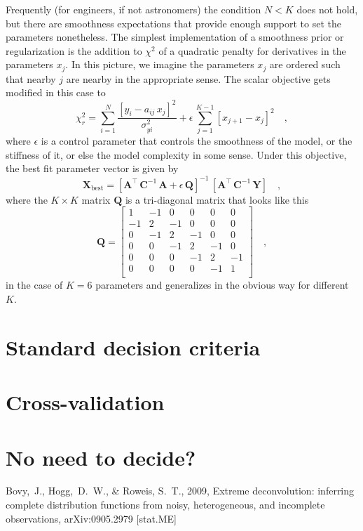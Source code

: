 \documentclass[12pt,twoside]{article}
\newcommand{\mmatrix}[1]{\boldsymbol{#1}}
\newcommand{\inverse}[1]{{#1}^{-1}}
\newcommand{\transpose}[1]{{#1}^{\scriptscriptstyle \top}}
\newcommand{\mA}{\mmatrix{A}}
\newcommand{\mAT}{\transpose{\mA}}
\newcommand{\mC}{\mmatrix{C}}
\newcommand{\mCinv}{\inverse{\mC}}
\newcommand{\mQ}{\mmatrix{Q}}
\newcommand{\mX}{\mmatrix{X}}
\newcommand{\mY}{\mmatrix{Y}}
\newcommand{\best}{\mathrm{best}}
\begin{document}
Frequently (for engineers, if not astronomers) the condition $N<K$
does not hold, but there are smoothness expectations that provide
enough support to set the parameters nonetheless.  The simplest
implementation of a smoothness prior or regularization is the addition
to $\chi^2$ of a quadratic penalty for derivatives in the parameters
$x_j$.  In this picture, we imagine the parameters $x_j$ are ordered
such that nearby $j$ are nearby in the appropriate sense.  The scalar
objective gets modified in this case to
\begin{equation}
\chi_r^2 = \sum_{i=1}^N
  \frac{\left[y_i - a_{ij}\,x_j\right]^2}{\sigma_{yi}^2}
  + \epsilon\,\sum_{j=1}^{K-1}\left[x_{j+1}-x_j\right]^2
  \quad ,
\end{equation}
where $\epsilon$ is a control parameter that controls the smoothness
of the model, or the stiffness of it, or else the model complexity in
some sense.  Under this objective, the best fit parameter vector is
given by
\begin{equation}
\mX_\best = \inverse{\left[\mAT\,\mCinv\,\mA + \epsilon\,\mQ\right]}
  \,\left[\mAT\,\mCinv\,\mY\right]
  \quad ,
\end{equation}
where the $K\times K$ matrix $\mQ$ is a tri-diagonal matrix that looks
like this
\begin{equation}
\mQ = \left[\begin{array}{cccccc}
    1 &-1 & 0 & 0 & 0 & 0 \\
   -1 & 2 &-1 & 0 & 0 & 0 \\
    0 &-1 & 2 &-1 & 0 & 0 \\
    0 & 0 &-1 & 2 &-1 & 0 \\
    0 & 0 & 0 &-1 & 2 &-1 \\
    0 & 0 & 0 & 0 &-1 & 1 \\
  \end{array}\right]
  \quad ,
\end{equation}
in the case of $K=6$ parameters and generalizes in the obvious way for
different $K$.

\section{Standard decision criteria}

\section{Cross-validation}

\section{No need to decide?}

\clearpage
{}\theendnotes

\clearpage
\begin{thebibliography}{}
  Bovy,~J., Hogg,~D.~W., \& Roweis, S.~T., 2009,
  Extreme deconvolution: inferring complete distribution functions from noisy, heterogeneous, and incomplete observations, 
  arXiv:0905.2979 [stat.ME]
\end{thebibliography}
\end{document}
